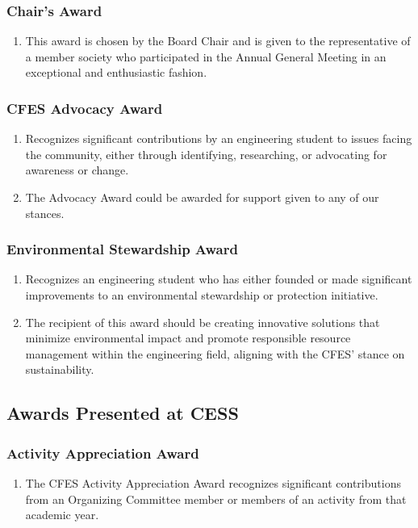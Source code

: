 \subsubsection{Chair's Award}
\label{chairs-award}

\begin{enumerate}
 \item
  This award is chosen by the Board Chair and is given to the representative of a member society who participated in the Annual General Meeting in an exceptional and enthusiastic fashion.
\end{enumerate}

\subsubsection{CFES Advocacy Award}
\label{cfes-advocacy-award}

\begin{enumerate}
 \item
  Recognizes significant contributions by an engineering student to issues facing the community, either through identifying, researching, or advocating for awareness or change.
 \item
  The Advocacy Award could be awarded for support given to any of our stances.
\end{enumerate}

\subsubsection{Environmental Stewardship Award}
\label{environmental-stewardship-award}

\begin{enumerate}
 \item
  Recognizes an engineering student who has either founded or made significant improvements to an environmental stewardship or protection initiative.
 \item
  The recipient of this award should be creating innovative solutions that minimize environmental impact and promote responsible resource management within the engineering field, aligning with the CFES' stance on sustainability.
\end{enumerate}

\subsection{Awards Presented at CESS}
\label{awards-presented-at-cess}

\subsubsection{Activity Appreciation Award}
\label{activity-appreciation-award}

\begin{enumerate}
 \item
  The CFES Activity Appreciation Award recognizes significant contributions from an Organizing Committee member or members of an activity from that academic year.
\end{enumerate}

